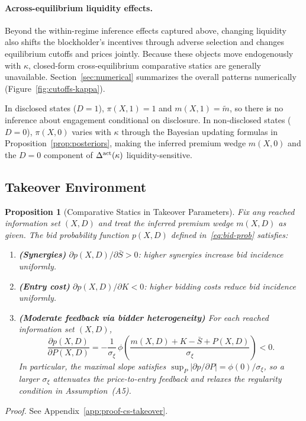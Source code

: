 \documentclass[11pt]{article}
\newtheorem{proposition}{Proposition}
\newcommand{\1}{\mathbf{1}}
\begin{document}
\paragraph{Across-equilibrium liquidity effects.}
Beyond the within-regime inference effects captured above, changing liquidity also shifts the blockholder's incentives through adverse selection and changes equilibrium cutoffs and prices jointly. Because these objects move endogenously with $\kappa$, closed-form cross-equilibrium comparative statics are generally unavailable. Section~\ref{sec:numerical} summarizes the overall patterns numerically (Figure~\ref{fig:cutoffs-kappa}).

In disclosed states ($D=1$), $\pi(X,1)=1$ and $m(X,1)=\tilde{m}$, so there is no inference about engagement conditional on disclosure. In non-disclosed states ($D=0$), $\pi(X,0)$ varies with $\kappa$ through the Bayesian updating formulas in Proposition~\ref{prop:posteriors}, making the inferred premium wedge $m(X,0)$ and the $D=0$ component of $\Delta^{\textup{act}}(\kappa)$ liquidity-sensitive.

\subsection{Takeover Environment}

\begin{proposition}[Comparative Statics in Takeover Parameters]
\label{prop:cs-takeover}
Fix any reached information set $(X,D)$ and treat the inferred premium wedge $m(X,D)$ as given. The bid probability function $p(X,D)$ defined in~\eqref{eq:bid-prob} satisfies:
\begin{enumerate}[label=\textup{(\alph*)},leftmargin=2em]
\item \textbf{(Synergies)} $\partial p(X,D) / \partial \bar{S} > 0$: higher synergies increase bid incidence uniformly.
\item \textbf{(Entry cost)} $\partial p(X,D) / \partial K < 0$: higher bidding costs reduce bid incidence uniformly.
\item \textbf{(Moderate feedback via bidder heterogeneity)} For each reached information set $(X,D)$,
\[
\frac{\partial p(X,D)}{\partial P(X,D)}=-\frac{1}{\sigma_\xi}\,\phi\!\left(\frac{m(X,D)+K-\bar{S}+P(X,D)}{\sigma_\xi}\right)<0.
\]
In particular, the maximal slope satisfies $\sup_{P}\bigl|\partial p/\partial P\bigr|=\phi(0)/\sigma_\xi$, so a larger $\sigma_\xi$ attenuates the price-to-entry feedback and relaxes the regularity condition in Assumption~\textup{(A5)}.
\end{enumerate}
\end{proposition}
\textit{Proof.} See Appendix~\ref{app:proof-cs-takeover}.
\end{document}
